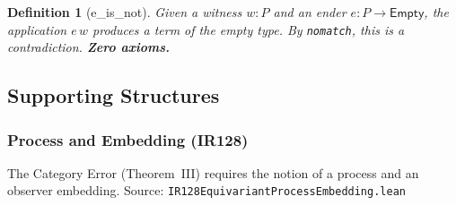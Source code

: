 \documentclass[12pt,a4paper]{article}
\newtheorem{definition}[thm]{Definition}
\begin{document}
\begin{definition}[e\_is\_not]
Given a witness $w : P$ and an ender $e : P \to \mathsf{Empty}$,
the application $e\,w$ produces a term of the empty type.
By \texttt{nomatch}, this is a contradiction. \textbf{Zero axioms.}
\end{definition}

\subsection{Supporting Structures}

\subsubsection{Process and Embedding (IR128)}

The Category Error (Theorem~III) requires the notion of a process
and an observer embedding. Source: \texttt{IR128EquivariantProcessEmbedding.lean}
\end{document}
